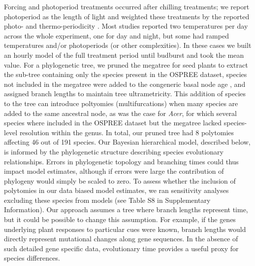 \documentclass[11pt]{article}
\begin{document}
Forcing and photoperiod treatments occurred after chilling treatments; we report photoperiod as the length of light and weighted these treatments by the reported photo- and thermo-periodicity \citep{buonaiuto2023experimental}. Most studies reported two temperatures per day across the whole experiment, one for day and night, but some had ramped temperatures and/or photoperiods (or other complexities). In these cases we built an hourly model of the full treatment period until budburst and took the mean value. %
For a phylogenetic tree, we pruned the megatree for seed plants \citep{smith2018constructing} to extract the sub-tree containing only the species present in the OSPREE dataset, species not included in the megatree were added to the congeneric basal node age \citep[using the function `congeneric.merge' in][]{pearse2015pez}, and assigned branch lengths to maintain tree ultrametricity. This addition of species to the tree can introduce poltyomies (multifurcations) when many species are added to the same ancestral node, as was the case for \emph{Acer}, for which several species where included in the OSPREE dataset but the megatree lacked species-level resolution within the genus. In total, our pruned tree had 8 polytomies affecting 46 out of 191 species. Our Bayesian hierarchical model, described below, is informed by the phylogenetic structure describing species evolutionary relationships. Errors in phylogenetic topology and branching times could thus impact model estimates, although if errors were large the contribution of phylogeny would simply be scaled to zero. To assess whether the inclusion of polytomies in our data biased model estimates, we ran sensitivity analyses excluding these species from models (see Table S8 in Supplementary Information). Our approach assumes a tree where branch lengths represent time, but it could be possible to change this assumption. For example, if the genes underlying plant responses to particular cues were known, branch lengths would directly represent mutational changes along gene sequences. In the absence of such detailed gene specific data, evolutionary time provides a useful proxy for species differences.\\ 
\end{document}

